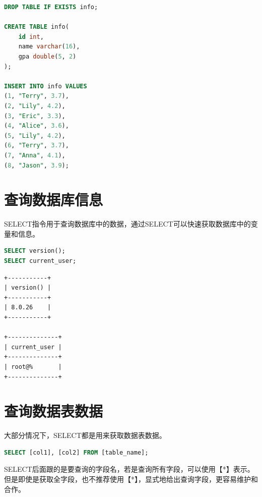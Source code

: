 \documentclass[12pt, openany, oneside]{book}
\begin{document}

\begin{lstlisting}[language=SQL]
DROP TABLE IF EXISTS info;

CREATE TABLE info(
    id int,
    name varchar(16),
    gpa double(5, 2)
);

INSERT INTO info VALUES
(1, "Terry", 3.7),
(2, "Lily", 4.2),
(3, "Eric", 3.3),
(4, "Alice", 3.6),
(5, "Lily", 4.2),
(6, "Terry", 3.7),
(7, "Anna", 4.1),
(8, "Jason", 3.9);
\end{lstlisting}

\vspace{0.5cm}

\section{查询数据库信息}

SELECT指令用于查询数据库中的数据，通过SELECT可以快速获取数据库中的变量和信息。\\


\begin{lstlisting}[language=SQL]
SELECT version();
SELECT current_user;
\end{lstlisting}

\begin{tcolorbox}
	\begin{verbatim}
+-----------+
| version() |
+-----------+
| 8.0.26    |
+-----------+

+--------------+
| current_user |
+--------------+
| root@%       |
+--------------+
\end{verbatim}
\end{tcolorbox}

\vspace{0.5cm}

\section{查询数据表数据}

大部分情况下，SELECT都是用来获取数据表数据。

\vspace{-0.5cm}

\begin{lstlisting}[language=SQL]
SELECT [col1], [col2] FROM [table_name];
\end{lstlisting}

SELECT后面跟的是要查询的字段名，若是查询所有字段，可以使用【*】表示。但是即使是获取全字段，也不推荐使用【*】，显式地给出查询字段，更容易维护和合作。
\end{document}
